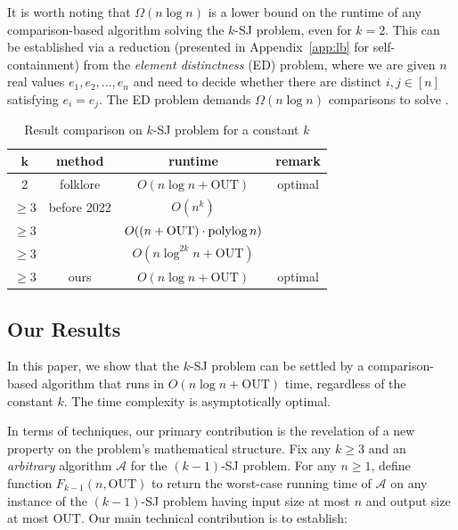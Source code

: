 \documentclass[sigconf]{acmart}
\def\vgap{\vspace{1mm}}
\def\figcapup{\vspace{-0mm}}
\def\figcapdown{\vspace{-0mm}}
\def\A{\mathcal{A}}
\def\out{\mathrm{OUT}}
\begin{document}
\vgap 

It is worth noting that $\Omega(n \log n)$ is a lower bound on the runtime of any comparison-based algorithm solving the $k$-SJ problem, even for $k = 2$. This can be established via a reduction (presented in Appendix~\ref{app:lb} for self-containment) from the {\em element distinctness} (ED) problem, where we are given $n$ real values $e_1, e_2, ..., e_n$ and need to decide whether there are distinct $i, j \in [n]$ satisfying $e_i = e_j$. The ED problem demands $\Omega(n \log n)$ comparisons to solve \cite{dl79}.

\begin{table} 
    \begin{tabular}{c|c|c|c} 
        $\bm{k}$ & {\bf method} & {\bf runtime} & {\bf remark} \\
        \hline\hline 
        2 & folklore & $O(n \log n + \out)$ & optimal \\ 
        \hline
        $\ge 3$ & before 2022 & $O(n^k)$ &  \\
        $\ge 3$ & \cite{ty22} & $O((n + \out) \cdot \polylog n)$ & \\
        $\ge 3$ & \cite{kcko22} & $O(n \log^{2k} n + \out)$ & \\
        \hline
        $\ge 3$ & ours & $O(n \log n + \out)$ & optimal
    \end{tabular}
    
    \vspace{3mm}
    \figcapup 
    \caption{Result comparison on $k$-SJ problem for a constant $k$}
    \label{tab:results-com}
    \figcapdown \vspace{-5mm}
\end{table}

\subsection{Our Results} \label{sec:intro:ours} 

In this paper, we show that the $k$-SJ problem can be settled by a comparison-based algorithm that runs in $O(n \log n + \out)$ time, regardless of the constant $k$. The time complexity is asymptotically optimal.

\vgap 

In terms of techniques, our primary contribution is the revelation of a new property on the problem's mathematical structure. Fix any $k \ge 3$ and an {\em arbitrary} algorithm $\A$ for the $(k-1)$-SJ problem. For any $n \ge 1$, define function $F_{k-1}(n, \out)$ to return the worst-case running time of $\A$ on any instance of the $(k-1)$-SJ problem having input size at most $n$ and output size at most $\out$. Our main technical contribution is to establish:
\end{document}
